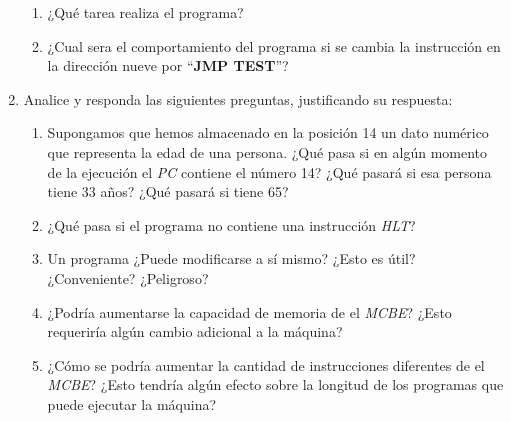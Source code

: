 \documentclass[12pt]{article}
\begin{document}
\begin{enumerate}
\begin{tabular}{|r||l|l|l|}
        \end{tabular}

        \begin{enumerate}

            \item ¿Qué tarea realiza el programa?

            \item ¿Cual sera el comportamiento del programa si se cambia la
                instrucción en la dirección nueve por ``\textbf{JMP TEST}''?

        \end{enumerate}


    \item Analice y responda las siguientes preguntas, justificando su
        respuesta:

        \begin{enumerate}

            \item Supongamos que hemos almacenado en la posición 14 un dato
                numérico que representa la edad de una persona. ¿Qué pasa si
                en algún momento de la ejecución el \emph{PC} contiene el
                número 14? ¿Qué pasará si esa persona tiene 33 años? ¿Qué
                pasará si tiene 65?

            \item ¿Qué pasa si el programa no contiene una instrucción
                \emph{HLT}?

            \item Un programa ¿Puede modificarse a sí mismo? ¿Esto es útil?
                ¿Conveniente? ¿Peligroso?

            \item ¿Podría aumentarse la capacidad de memoria de el
                \emph{MCBE}? ¿Esto requeriría algún cambio adicional a la
                máquina?

            \item ¿Cómo se podría aumentar la cantidad de instrucciones
                diferentes de el \emph{MCBE}? ¿Esto tendría algún efecto sobre
                la longitud de los programas que puede ejecutar la máquina?

        \end{enumerate}


\end{enumerate}

\appendix
\clearpage
\addappheadtotoc
\appendixpage
\end{document}
